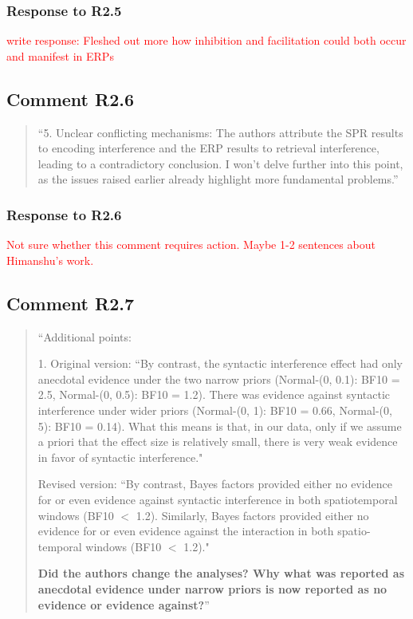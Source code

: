 \documentclass[12pt]{article}
\begin{document}
\subsubsection*{Response to R2.5}
 
  \textcolor{red}{write response: Fleshed out more how inhibition and facilitation could both occur and manifest in ERPs}

\begin{quote}
\end{quote}
 
\subsection*{Comment R2.6}
\begin{quote}
``5. Unclear conflicting mechanisms: The authors attribute the SPR results to encoding interference and the ERP results to retrieval interference, leading to a contradictory conclusion. I won't delve further into this point, as the issues raised earlier already highlight more fundamental problems.''
\end{quote}
\subsubsection*{Response to R2.6}
\textcolor{red}{Not sure whether this comment requires action. Maybe 1-2 sentences about Himanshu's work.}
 
\subsection*{Comment R2.7}
\begin{quote}
``Additional points:

1. Original version: ``By contrast, the syntactic interference effect had only anecdotal evidence under the two narrow priors (Normal-(0, 0.1): BF10 = 2.5, Normal-(0, 0.5): BF10 = 1.2). There was evidence against syntactic interference under wider priors (Normal-(0, 1): BF10 = 0.66, Normal-(0, 5): BF10 = 0.14). What this means is that, in our data, only if we assume a priori that the effect size is relatively small, there is very weak evidence in favor of syntactic interference."

Revised version: ``By contrast, Bayes factors provided either no evidence for or even evidence against syntactic interference in both spatiotemporal windows (BF10 $<$ 1.2). Similarly, Bayes factors provided either no evidence for or even evidence against the interaction in both spatio-temporal windows (BF10 $<$ 1.2)."

\textbf{Did the authors change the analyses? Why what was reported as anecdotal evidence under narrow priors is now reported as no evidence or evidence against?}''
\end{quote}
\end{document}
